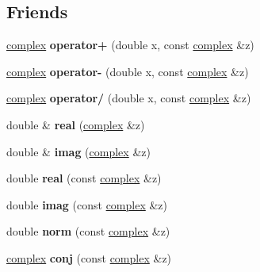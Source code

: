 \subsection*{Friends}
\begin{DoxyCompactItemize}
\item 
\mbox{\label{classcomplex_a16cdb9ed1871116f72a2b64337dd396c}} 
\mbox{\hyperlink{classcomplex}{complex}} {\bfseries operator+} (double x, const \mbox{\hyperlink{classcomplex}{complex}} \&z)
\item 
\mbox{\label{classcomplex_a1dfb39ebfca8156eacee00d4d0b36c4b}} 
\mbox{\hyperlink{classcomplex}{complex}} {\bfseries operator-\/} (double x, const \mbox{\hyperlink{classcomplex}{complex}} \&z)
\item 
\mbox{\label{classcomplex_aa0830a62ca6e2b1d6789caef36086d7b}} 
\mbox{\hyperlink{classcomplex}{complex}} {\bfseries operator/} (double x, const \mbox{\hyperlink{classcomplex}{complex}} \&z)
\item 
\mbox{\label{classcomplex_a10b8cb0eba7d2791c0f4de7d860f01d1}} 
double \& {\bfseries real} (\mbox{\hyperlink{classcomplex}{complex}} \&z)
\item 
\mbox{\label{classcomplex_a2ff31e9507e7dc48651b4e448ac98159}} 
double \& {\bfseries imag} (\mbox{\hyperlink{classcomplex}{complex}} \&z)
\item 
\mbox{\label{classcomplex_a075dd12490d06326130b46dda0d616a8}} 
double {\bfseries real} (const \mbox{\hyperlink{classcomplex}{complex}} \&z)
\item 
\mbox{\label{classcomplex_a54e570e34b8ff9691500e8fd27955fdb}} 
double {\bfseries imag} (const \mbox{\hyperlink{classcomplex}{complex}} \&z)
\item 
\mbox{\label{classcomplex_adcb2904dc1b01d5ed3a9b6b3bd135d9b}} 
double {\bfseries norm} (const \mbox{\hyperlink{classcomplex}{complex}} \&z)
\item 
\mbox{\label{classcomplex_ac4eba7c0a4012bfc017abe67291dace1}} 
\mbox{\hyperlink{classcomplex}{complex}} {\bfseries conj} (const \mbox{\hyperlink{classcomplex}{complex}} \&z)

\end{DoxyCompactItemize}
